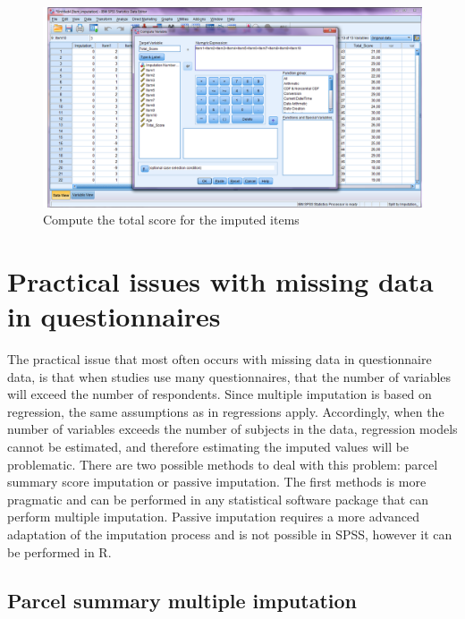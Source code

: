 \documentclass[]{book}
\begin{document}
\begin{figure}

{\centering \includegraphics[width=0.9\linewidth]{images/fig8.6} 

}

\caption{Compute the total score for the imputed items}\label{fig:fig8-6}
\end{figure}

\section{Practical issues with missing data in
questionnaires}\label{practical-issues-with-missing-data-in-questionnaires}

The practical issue that most often occurs with missing data in
questionnaire data, is that when studies use many questionnaires, that
the number of variables will exceed the number of respondents. Since
multiple imputation is based on regression, the same assumptions as in
regressions apply. Accordingly, when the number of variables exceeds the
number of subjects in the data, regression models cannot be estimated,
and therefore estimating the imputed values will be problematic. There
are two possible methods to deal with this problem: parcel summary score
imputation or passive imputation. The first methods is more pragmatic
and can be performed in any statistical software package that can
perform multiple imputation. Passive imputation requires a more advanced
adaptation of the imputation process and is not possible in SPSS,
however it can be performed in R.

\subsection{Parcel summary multiple
imputation}\label{parcel-summary-multiple-imputation}
\end{document}
